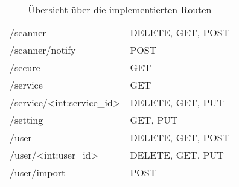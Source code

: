 \begin{table}
\begin{tabular}{l l}
		/scanner								 & DELETE, GET, POST \\
		/scanner/notify							 & POST \\
		/secure									 & GET \\
		/service								 & GET \\
		/service/<int:service\_id>				 & DELETE, GET, PUT \\
		/setting								 & GET, PUT \\
		/user									 & DELETE, GET, POST \\
		/user/<int:user\_id>					 & DELETE, GET, PUT \\
		/user/import							 & POST \\
	\end{tabular}
	\caption{Übersicht über die implementierten Routen}
	\label{table:gis-routes}
\end{table}